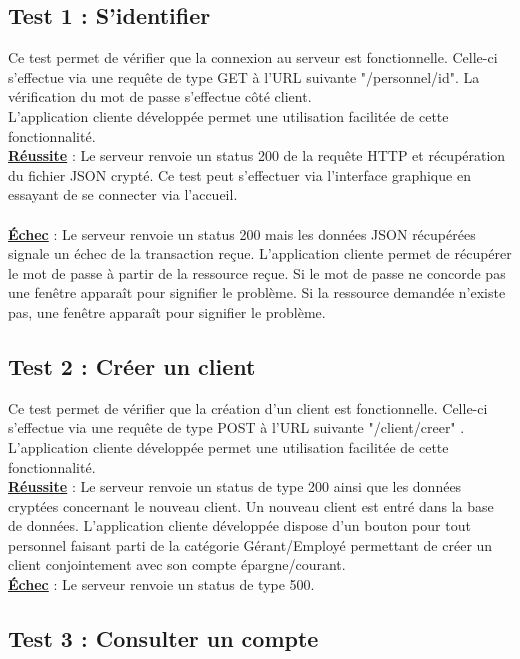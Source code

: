\subsection{Test 1 : S'identifier}

Ce test permet de vérifier que la connexion au serveur est fonctionnelle.
Celle-ci s'effectue via une requête de type GET à l'URL suivante "/personnel/{id}".
La vérification du mot de passe s'effectue côté client. 
\\
L'application cliente développée permet une utilisation facilitée de cette fonctionnalité. 
\\
\textbf{\underline{Réussite}} : Le serveur renvoie un status 200 de la requête HTTP et récupération du fichier JSON crypté. Ce test peut s'effectuer via l'interface graphique en essayant de se connecter via l'accueil.\\
\\
\textbf{\underline{Échec}} : Le serveur renvoie un status 200 mais les données JSON récupérées signale un échec de la transaction reçue.
L'application cliente permet de récupérer le mot de passe à partir de la ressource reçue. Si le mot de passe ne concorde pas une fenêtre apparaît pour signifier le problème.
Si la ressource demandée n'existe pas,  une fenêtre apparaît pour signifier le problème.

\subsection{Test 2 : Créer un client}

Ce test permet de vérifier que la création d'un client est fonctionnelle.
Celle-ci s'effectue via une requête de type POST à l'URL suivante "/client/creer" .
\\
L'application cliente développée permet une utilisation facilitée de cette fonctionnalité. 
\\
\textbf{\underline{Réussite}} : Le serveur renvoie un status de type 200 ainsi que les données cryptées concernant le nouveau client. Un nouveau client est entré dans la base de données.
L'application cliente développée dispose d'un bouton pour tout personnel faisant parti de la catégorie Gérant/Employé permettant de créer un client conjointement avec son compte épargne/courant.
\\
\textbf{\underline{Échec}} : Le serveur renvoie un status de type 500.

\subsection{Test 3 : Consulter un compte}

